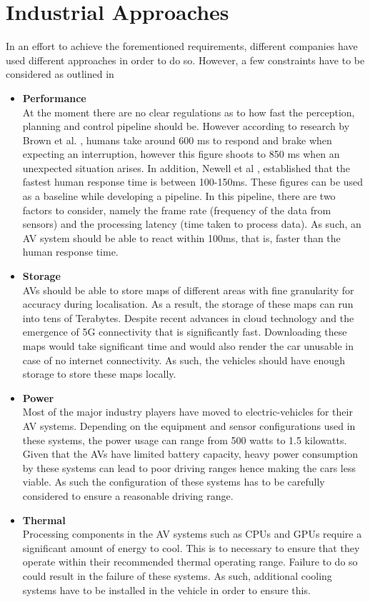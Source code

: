 \section{Industrial Approaches}
In an effort to achieve the forementioned requirements, different companies have used different approaches in order to do so.
However, a few constraints have to be considered as outlined in \cite{lin2018architectural}
\begin{itemize}
	\item \textbf{Performance} \\
	At the moment there are no clear regulations as to how fast the perception, planning and control pipeline should be. However according to research by Brown et al. \cite{brown1994human}, humans take around 600 ms to respond and brake when expecting an interruption, however this figure shoots to 850 ms when an unexpected situation arises. In addition, Newell et al \cite{newell1985prospects}, established that the fastest human response time is between 100-150ms. These figures can be used as a baseline while developing a pipeline. In this pipeline, there are two factors to consider, namely the frame rate (frequency of the data from sensors) and the processing latency (time taken to process data). As such, an AV system should be able to react within 100ms, that is, faster than the human response time.
	
	\item \textbf{Storage} \\ 
	AVs should be able to store maps of different areas with fine granularity for accuracy during localisation. As a result, the storage of these maps can run into tens of Terabytes. Despite recent advances in cloud technology and the emergence of 5G connectivity that is significantly fast. Downloading these maps would take significant time and would also render the car unusable in case of no internet connectivity. As such, the vehicles should have enough storage to store these maps locally. 
	
	\item \textbf{Power} \\
	Most of the major industry players have moved to electric-vehicles for their AV systems. Depending on the equipment and sensor configurations used in these systems, the power usage can range from 500 watts to 1.5 kilowatts. Given that the AVs have limited battery capacity, heavy power consumption by these systems can lead to poor driving ranges hence making the cars less viable. As such the configuration of these systems has to be carefully considered to ensure a reasonable driving range. 

	\item \textbf{Thermal} \\
	Processing components in the AV systems such as CPUs and GPUs require a significant amount of energy to cool. This is to necessary to ensure that they operate within their recommended thermal operating range. Failure to do so could result in the failure of these systems. As such, additional cooling systems have to be installed in the vehicle in order to ensure this. 
	
\end{itemize}
